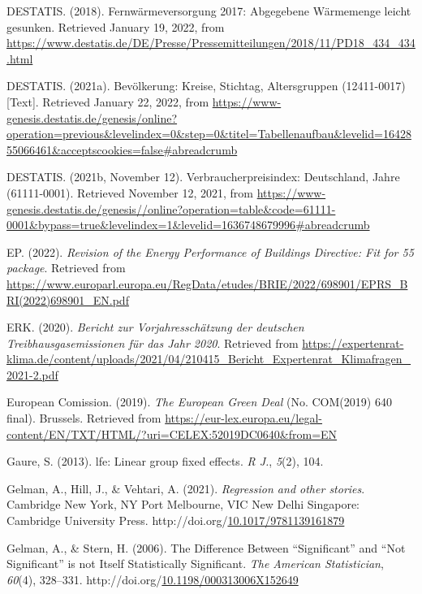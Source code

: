 \documentclass[12pt,twoside]{reedthesis}
\newlength{\cslhangindent}
\newenvironment{CSLReferences}[2] %
 {%
  \setlength{\parindent}{0pt}
  \ifodd #1 \everypar{\setlength{\hangindent}{\cslhangindent}}\ignorespaces\fi
  \ifnum #2 > 0
  \setlength{\parskip}{#2\baselineskip}
  \fi
 }%
 {}
\begin{document}
\begin{CSLReferences}{1}{0}
\leavevmode{}%
DESTATIS. (2018). Fernwärmeversorgung 2017: Abgegebene Wärmemenge leicht gesunken. Retrieved January 19, 2022, from \url{https://www.destatis.de/DE/Presse/Pressemitteilungen/2018/11/PD18_434_434.html}

\leavevmode{}%
DESTATIS. (2021a). Bevölkerung: Kreise, Stichtag, Altersgruppen (12411-0017) {[}Text{]}. Retrieved January 22, 2022, from \url{https://www-genesis.destatis.de/genesis/online?operation=previous\&levelindex=0\&step=0\&titel=Tabellenaufbau\&levelid=1642855066461\&acceptscookies=false\#abreadcrumb}

\leavevmode{}%
DESTATIS. (2021b, November 12). Verbraucherpreisindex: Deutschland, Jahre (61111-0001). Retrieved November 12, 2021, from \url{https://www-genesis.destatis.de/genesis//online?operation=table\&code=61111-0001\&bypass=true\&levelindex=1\&levelid=1636748679996\#abreadcrumb}

\leavevmode{}%
EP. (2022). \emph{Revision of the Energy Performance of Buildings Directive: Fit for 55 package}. Retrieved from \url{https://www.europarl.europa.eu/RegData/etudes/BRIE/2022/698901/EPRS_BRI(2022)698901_EN.pdf}

\leavevmode{}%
ERK. (2020). \emph{Bericht zur Vorjahresschätzung der deutschen Treibhausgasemissionen für das Jahr 2020}. Retrieved from \url{https://expertenrat-klima.de/content/uploads/2021/04/210415_Bericht_Expertenrat_Klimafragen_2021-2.pdf}

\leavevmode{}%
European Comission. (2019). \emph{The European Green Deal} (No. COM(2019) 640 final). Brussels. Retrieved from \url{https://eur-lex.europa.eu/legal-content/EN/TXT/HTML/?uri=CELEX:52019DC0640\&from=EN}

\leavevmode{}%
Gaure, S. (2013). lfe: Linear group fixed effects. \emph{R J.}, \emph{5}(2), 104.

\leavevmode{}%
Gelman, A., Hill, J., \& Vehtari, A. (2021). \emph{Regression and other stories}. Cambridge New York, NY Port Melbourne, VIC New Delhi Singapore: Cambridge University Press. http://doi.org/\href{https://doi.org/10.1017/9781139161879}{10.1017/9781139161879}

\leavevmode{}%
Gelman, A., \& Stern, H. (2006). The Difference Between {``Significant''} and {``Not Significant''} is not Itself Statistically Significant. \emph{The American Statistician}, \emph{60}(4), 328--331. http://doi.org/\href{https://doi.org/10.1198/000313006X152649}{10.1198/000313006X152649}


\end{CSLReferences}
\end{document}
